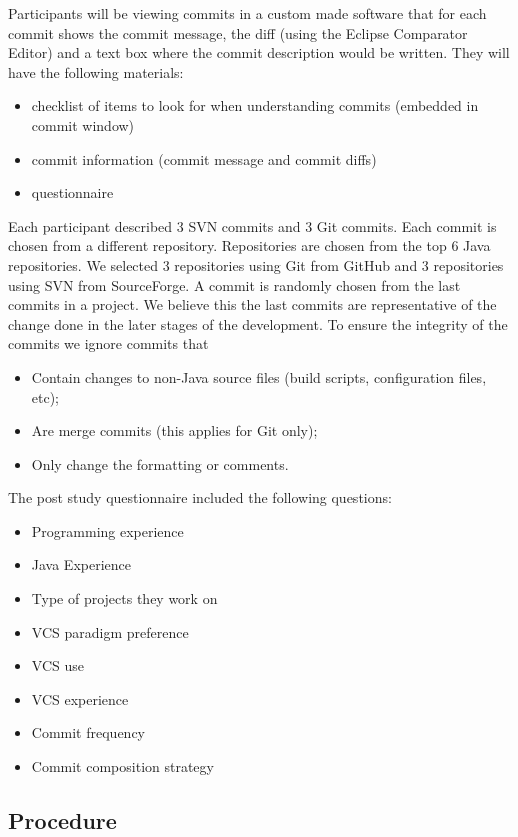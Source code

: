 \documentclass[letterpaper]{article}
\begin{document}
Participants will be viewing commits in a custom made software that for each commit shows the commit message, the diff (using the Eclipse Comparator Editor) and a text box where the commit description would be written.
They will have the following materials:
\begin{itemize}
	\item checklist of items to look for when understanding commits (embedded in commit window)
	\item commit information (commit message and commit diffs)
	\item questionnaire
\end {itemize}

Each participant described 3 SVN commits and 3 Git commits.
Each commit is chosen from a different repository.
Repositories are chosen from the top 6 Java repositories.
We selected 3 repositories using Git from GitHub and 3 repositories using SVN from SourceForge.
A commit is randomly chosen from the last commits in a project.
We believe this the last commits are representative of the change done in the later stages of the development.
To ensure the integrity of the commits we ignore commits that 
\begin{itemize}
	\item Contain changes to non-Java source files (build scripts, configuration files, etc);
	\item Are merge commits (this applies for Git only);
	\item Only change the formatting or comments.
\end{itemize}

The post study questionnaire included the following questions: 
\begin{itemize}
	\item{Programming experience}
	\item{Java Experience}
	\item{Type of projects they work on}
	\item{VCS paradigm preference}
	\item{VCS use}
	\item{VCS experience}
	\item{Commit frequency}
	\item{Commit composition strategy}
\end{itemize}

\subsection{Procedure}
\end{document}
